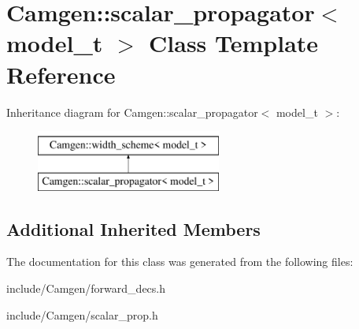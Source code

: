 \hypertarget{a00486}{\section{Camgen\-:\-:scalar\-\_\-propagator$<$ model\-\_\-t $>$ Class Template Reference}
\label{a00486}
}
Inheritance diagram for Camgen\-:\-:scalar\-\_\-propagator$<$ model\-\_\-t $>$\-:\begin{figure}[H]
\begin{center}
\leavevmode
\includegraphics[height=2.000000cm]{a00486}
\end{center}
\end{figure}
\subsection*{Additional Inherited Members}


The documentation for this class was generated from the following files\-:\begin{DoxyCompactItemize}
\item 
include/\-Camgen/forward\-\_\-decs.\-h\item 
include/\-Camgen/scalar\-\_\-prop.\-h\end{DoxyCompactItemize}
